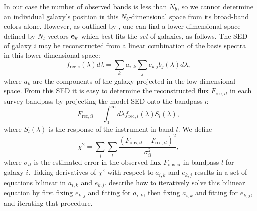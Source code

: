 \documentclass[10pt,preprint]{aastex}
\newcommand{\vv}[1]{{\bf #1}}
\begin{document}
In our case the number of observed bands is less than $N_b$, so we
cannot determine an individual galaxy's position in this
$N_b$-dimensional space from its broad-band colors alone.  However, as
outlined by \citet{csabai00a}, one can find a lower dimensional space
defined by $N_t$ vectors $\vv{e}_k$ which best fits the {\it set} of
galaxies, as follows. The SED of galaxy $i$ may be reconstructed from a
linear combination of the basis spectra in this lower dimensional
space:
\begin{equation}
\label{lincomb}
f_{\mathrm{rec},i}(\lambda) d\lambda = 
\sum_k a_{i,k} \sum_j e_{k,j} b_j(\lambda) d\lambda,
\end{equation}
where $a_k$ are the components of the galaxy projected in the
low-dimensional space. From this SED it is easy to determine the
reconstructed flux
$F_{\mathrm{rec},il}$ in each survey bandpass by projecting
the model SED onto the bandpass $l$: 
\begin{equation}
F_{\mathrm{rec},il} = \int_0^\infty d\lambda
f_{\mathrm{rec},i}(\lambda) S_l(\lambda),
\end{equation}
where $S_l(\lambda)$ is the response of the instrument in band $l$.  We define
\begin{equation}
\chi^2 = \sum_i \sum_l
\frac{(F_{\mathrm{obs},il}-F_{\mathrm{rec},il})^2}{\sigma_{il}^2},
\end{equation}
where $\sigma_{il}$ is the estimated error in the observed flux
$F_{\mathrm{obs},il}$ in bandpass $l$ for galaxy $i$. Taking
derivatives of $\chi^2$ with respect to $a_{i,k}$ and $e_{k,j}$
results in a set of equations bilinear in $a_{i,k}$ and $e_{k,j}$.
\citet{csabai00a} describe how to iteratively solve this bilinear
equation by first fixing $e_{k,j}$ and fitting for $a_{i,k}$, then
fixing $a_{i,k}$ and fitting for $e_{k,j}$, and iterating that
procedure.

\end{document}
